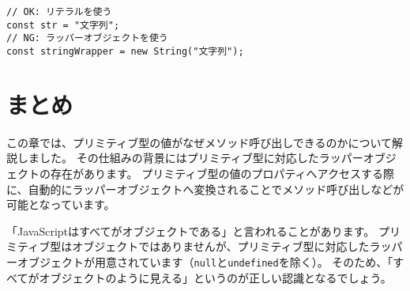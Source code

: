 \begin{lstlisting}
// OK: リテラルを使う
const str = "文字列";
// NG: ラッパーオブジェクトを使う
const stringWrapper = new String("文字列");
\end{lstlisting}

\hypertarget{wrapper-object-summary}{%
\section{まとめ}\label{wrapper-object-summary}}

この章では、プリミティブ型の値がなぜメソッド呼び出しできるのかについて解説しました。
その仕組みの背景にはプリミティブ型に対応したラッパーオブジェクトの存在があります。
プリミティブ型の値のプロパティへアクセスする際に、自動的にラッパーオブジェクトへ変換されることでメソッド呼び出しなどが可能となっています。

「JavaScriptはすべてがオブジェクトである」と言われることがあります。
プリミティブ型はオブジェクトではありませんが、プリミティブ型に対応したラッパーオブジェクトが用意されています（\texttt{null}と\texttt{undefined}を除く）。
そのため、「すべてがオブジェクトのように見える」というのが正しい認識となるでしょう。
